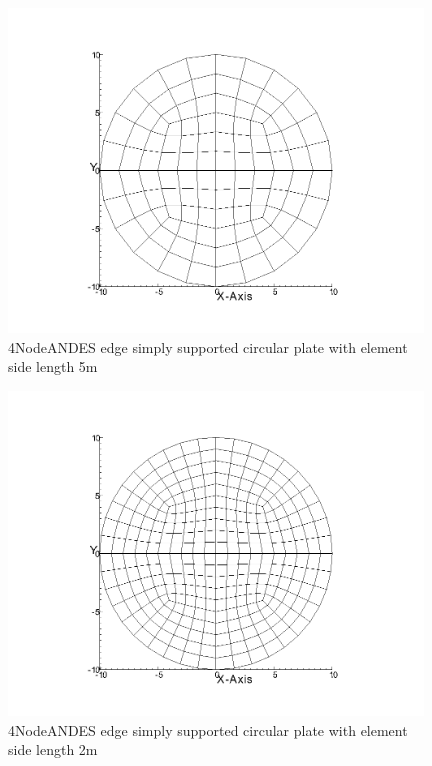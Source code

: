 \documentclass[fleqn,11pt,letter]{article}
\begin{document}
\newpage

\begin{figure}[H]
  \centering
  \includegraphics[width=11cm]{../Figure_files/4NodeANDES/circular_plate2.png}
  \caption{4NodeANDES edge simply supported circular plate with element side length 5m }
  \label{fig 4NodeANDES edges simply supported circular plate with element side length 5m }
\end{figure}


\begin{figure}[H]
  \centering
  \includegraphics[width=11cm]{../Figure_files/4NodeANDES/circular_plate3.png}
  \caption{4NodeANDES edge simply supported circular plate with element side length 2m }
  \label{fig 4NodeANDES edges simply supported circular plate with element side length 2m }
\end{figure}

\newpage
\end{document}
